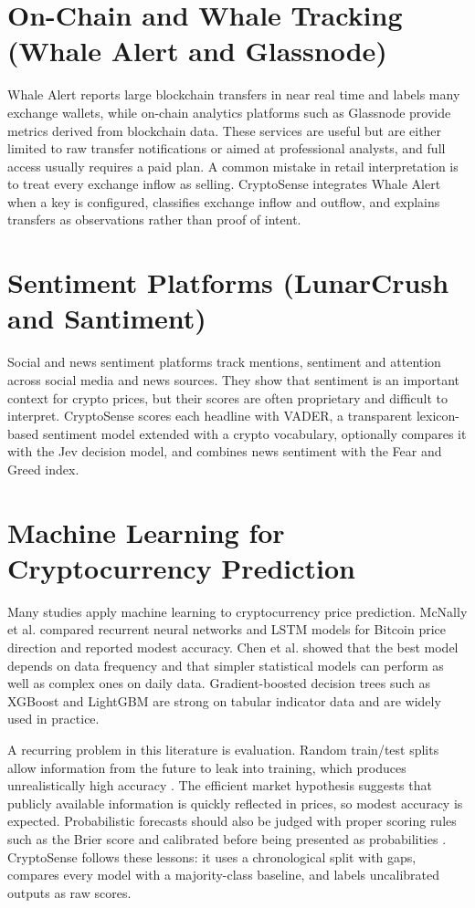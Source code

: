 \section{On-Chain and Whale Tracking (Whale Alert and Glassnode)}
Whale Alert reports large blockchain transfers in near real time and labels many exchange wallets, while on-chain analytics platforms such as Glassnode provide metrics derived from blockchain data. These services are useful but are either limited to raw transfer notifications or aimed at professional analysts, and full access usually requires a paid plan. A common mistake in retail interpretation is to treat every exchange inflow as selling. CryptoSense integrates Whale Alert when a key is configured, classifies exchange inflow and outflow, and explains transfers as observations rather than proof of intent.

\section{Sentiment Platforms (LunarCrush and Santiment)}
Social and news sentiment platforms track mentions, sentiment and attention across social media and news sources. They show that sentiment is an important context for crypto prices, but their scores are often proprietary and difficult to interpret. CryptoSense scores each headline with VADER, a transparent lexicon-based sentiment model \cite{hutto2014vader} extended with a crypto vocabulary, optionally compares it with the Jev decision model, and combines news sentiment with the Fear and Greed index.

\section{Machine Learning for Cryptocurrency Prediction}
Many studies apply machine learning to cryptocurrency price prediction. McNally et al. \cite{mcnally2018} compared recurrent neural networks and LSTM models for Bitcoin price direction and reported modest accuracy. Chen et al. \cite{chen2020bitcoin} showed that the best model depends on data frequency and that simpler statistical models can perform as well as complex ones on daily data. Gradient-boosted decision trees such as XGBoost \cite{chen2016xgboost} and LightGBM \cite{ke2017lightgbm} are strong on tabular indicator data and are widely used in practice.

A recurring problem in this literature is evaluation. Random train/test splits allow information from the future to leak into training, which produces unrealistically high accuracy \cite{lopezdeprado2018}. The efficient market hypothesis \cite{fama1970} suggests that publicly available information is quickly reflected in prices, so modest accuracy is expected. Probabilistic forecasts should also be judged with proper scoring rules such as the Brier score \cite{brier1950} and calibrated before being presented as probabilities \cite{niculescu2005}. CryptoSense follows these lessons: it uses a chronological split with gaps, compares every model with a majority-class baseline, and labels uncalibrated outputs as raw scores.

